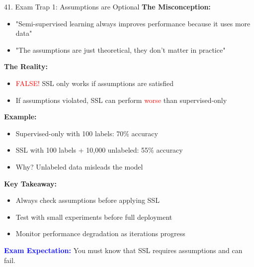 \documentclass[8pt]{beamer}
\begin{document}
	\begin{frame}{41. Exam Trap 1: Assumptions are Optional}
		\fontsize{6.5}{7.5}\selectfont
		\textbf{The Misconception:}
		\begin{itemize}
			\item "Semi-supervised learning always improves performance because it uses more data"
			\item "The assumptions are just theoretical, they don't matter in practice"
		\end{itemize}
		
		\textbf{The Reality:}
		\begin{itemize}
			\item \textcolor{red}{FALSE!} SSL only works if assumptions are satisfied
			\item If assumptions violated, SSL can perform \textcolor{red}{worse} than supervised-only
		\end{itemize}
		
		\textbf{Example:}
		\begin{itemize}
			\item Supervised-only with 100 labels: 70\% accuracy
			\item SSL with 100 labels + 10,000 unlabeled: 55\% accuracy
			\item Why? Unlabeled data misleads the model
		\end{itemize}
		
		\textbf{Key Takeaway:}
		\begin{itemize}
			\item Always check assumptions before applying SSL
			\item Test with small experiments before full deployment
			\item Monitor performance degradation as iterations progress
		\end{itemize}
		
		\textcolor{blue}{\textbf{Exam Expectation:}} You must know that SSL requires assumptions and can fail.
	\end{frame}
	
\end{document}
